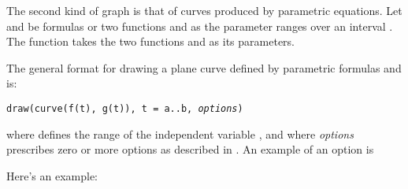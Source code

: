 The second kind of \twodim{} graph is that of
curves produced by parametric equations.
Let  and  be formulas or two
functions  and  as the parameter  ranges
over an interval \spad{[a,b]}.
The function  takes the two functions  and
 as its parameters.

\beginImportant
The general format for drawing a \twodim{} plane curve defined by
parametric formulas  and  is:
%
\begin{center}
{\tt draw(curve(f(t), g(t)), t = a..b, {\it options})}
\end{center}
where  defines the range of the independent variable ,
and where {\it options} prescribes zero or more options as
described in .
An example of an option is 
\endImportant

Here's an example:

